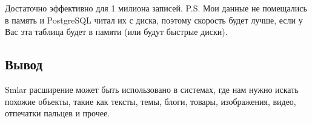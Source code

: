 Достаточно эффективно для 1 милиона записей. P.S. Мои данные не помещались в память и PostgreSQL читал их с диска, поэтому скорость будет лучше, если у Вас эта таблица будет в памяти (или будут быстрые диски).

\subsection{Вывод}

Smlar расширение может быть использовано в системах, где нам нужно искать похожие объекты, такие как тексты, темы, блоги, товары, изображения, видео, отпечатки пальцев и прочее.